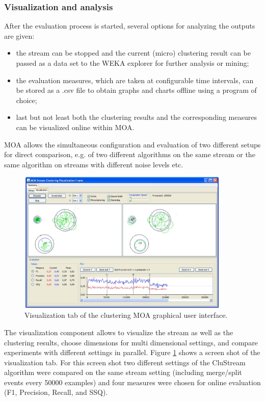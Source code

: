 \documentclass[a4paper,12pt,twoside]{book}
\begin{document}
\subsubsection{Visualization and analysis}
\label{sec:gui}

After the evaluation process is started, several options for analyzing the outputs are given:
\begin{itemize}
\item the stream can be stopped and the current (micro) clustering result can be passed as a data set to the WEKA explorer for further analysis or mining; 
\item the evaluation measures, which are taken at configurable time intervals, can be stored as a {.csv} file to obtain graphs and charts offline using a program of choice;
\item last but not least both the clustering results and the corresponding measures can be visualized online within MOA.\end{itemize}


MOA allows the simultaneous configuration and evaluation of two different setups for direct comparison, e.g. of two different algorithms 
on the same stream or the same algorithm on streams with different noise levels etc.

\begin{figure}[t]
\begin{center} 
\includegraphics[width=0.9\textwidth]{images/VisualTab}%
\end{center} 
\caption{Visualization tab of the clustering MOA graphical user interface.}
\label{fig:VisualTab}
\end{figure}

The visualization component allows to visualize the stream as well as the clustering results, choose dimensions for multi dimensional settings, and compare experiments with different settings in parallel. 
Figure \ref{fig:VisualTab} shows a screen shot of the visualization tab. 
For this screen shot two different settings of the CluStream algorithm were compared on the same stream setting (including merge/split events every 50000 examples) 
and four measures were chosen for online evaluation (F1, Precision, Recall, and SSQ). 
\end{document}

